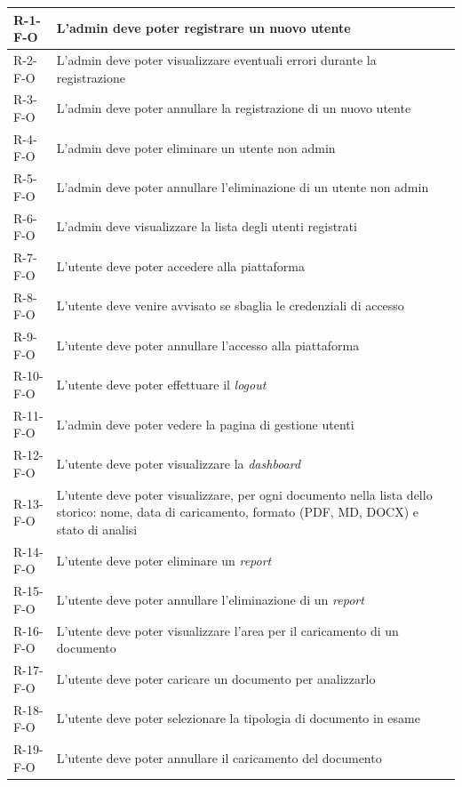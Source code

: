 \begin{xltabular}{\textwidth}{lXl}
    R-1-F-O & L'admin deve poter registrare un nuovo utente &  \\ \hline
    R-2-F-O & L'admin deve poter visualizzare eventuali errori durante la registrazione &  \\ \hline
    R-3-F-O & L'admin deve poter annullare la registrazione di un nuovo utente &  \\ \hline
    R-4-F-O & L'admin deve poter eliminare un utente non admin &  \\ \hline
    R-5-F-O & L'admin deve poter annullare l'eliminazione di un utente non admin &  \\ \hline
    R-6-F-O & L'admin deve visualizzare la lista degli utenti registrati &  \\ \hline
    R-7-F-O & L'utente deve poter accedere alla piattaforma &  \\ \hline
    R-8-F-O & L'utente deve venire avvisato se sbaglia le credenziali di accesso &  \\ \hline
    R-9-F-O & L'utente deve poter annullare l'accesso alla piattaforma &  \\ \hline
    R-10-F-O & L'utente deve poter effettuare il \emph{logout} &  \\ \hline
    R-11-F-O & L'admin deve poter vedere la pagina di gestione utenti &  \\ \hline
    R-12-F-O & L'utente deve poter visualizzare la \emph{dashboard} &  \\ \hline
    R-13-F-O & L'utente deve poter visualizzare, per ogni documento nella lista dello storico: nome, data di caricamento, formato (PDF, MD, DOCX) e stato di analisi &  \\ \hline
    R-14-F-O & L'utente deve poter eliminare un \emph{report} &  \\ \hline
    R-15-F-O & L'utente deve poter annullare l'eliminazione di un \emph{report} &  \\ \hline
    R-16-F-O & L'utente deve poter visualizzare l'area per il caricamento di un documento &  \\ \hline
    R-17-F-O & L'utente deve poter caricare un documento per analizzarlo &  \\ \hline
    R-18-F-O & L'utente deve poter selezionare la tipologia di documento in esame &  \\ \hline
    R-19-F-O & L'utente deve poter annullare il caricamento del documento &  \\ \hline

\end{xltabular}
